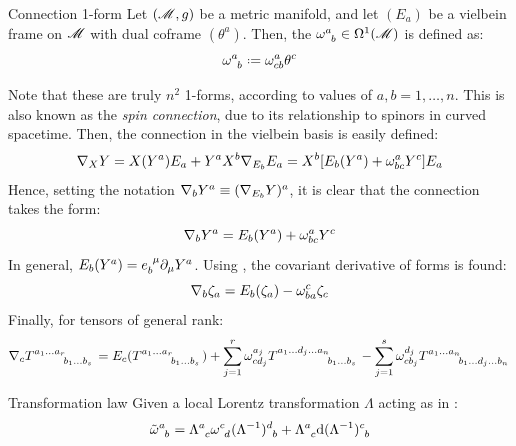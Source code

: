 \begin{definition}{Connection 1-form}{}
  Let $ (\mathscr{M},g) $ be a metric manifold, and let $ (E_a) $ be a vielbein frame on $ \mathscr{M} $ with dual coframe $ (\theta^a) $. Then, the  $ \tensor{\omega}{^a_b} \in \df{1} $ is defined as:
  \begin{equation}
    \tensor{\omega}{^a_b} \defeq \omega^a_{cb} \theta^c
    \label{eq:connection-1-form}
  \end{equation}
\end{definition}

Note that these are truly $ n^2 $ 1-forms, according to values of $ a,b = 1, \dots, n $. This is also known as the \textit{spin connection}, due to its relationship to spinors in curved spacetime.
Then, the connection in the vielbein basis is easily defined:
\begin{equation*}
  \nabla_X Y = X(Y^a) E_a + Y^a X^b \nabla_{E_b} E_a = X^b [E_b(Y^a) + \omega^a_{bc} Y^c] E_a
\end{equation*}
Hence, setting the notation $ \nabla_b Y^a \equiv (\nabla_{E_b} Y)^a $, it is clear that the connection takes the form:
\begin{equation}
  \nabla_b Y^a = E_b(Y^a) + \omega^a_{bc} Y^c
  \label{eq:vielbein-cov-der}
\end{equation}
In general, $ E_b(Y^a) = \tensor{e}{_b^\mu} \pa_\mu Y^a $. Using , the covariant derivative of forms is found:
\begin{equation}
  \nabla_b \zeta_a = E_b(\zeta_a) - \omega^c_{ba} \zeta_c
\end{equation}
Finally, for tensors of general rank:
\begin{equation}
  \na_c \tensor{T}{^{a_1 \dots a_r}_{b_1 \dots b_s}} = E_c(\tensor{T}{^{a_1 \dots a_r}_{b_1 \dots b_s}}) + \sum_{j = 1}^r \omega^{a_j}_{c d_j} \tensor{T}{^{a_1 \dots d_j \dots a_n}_{b_1 \dots b_s}} - \sum_{j = 1}^s \omega^{d_j}_{c b_j} \tensor{T}{^{a_1 \dots a_n}_{b_1 \dots d_j \dots b_n}}
\end{equation}

\begin{lemma}{Transformation law}{}
  Given a local Lorentz transformation $ \Lambda $ acting as in :
  \begin{equation}
    \tensor{\tilde{\omega}}{^a_b} = \tensor{\Lambda}{^a_c} \tensor{\omega}{^c_d} \tensor{(\Lambda^{-1})}{^d_b} + \tensor{\Lambda}{^a_c} \dd \tensor{(\Lambda^{-1})}{^c_b}
    \label{eq:con-1-form-trans}
  \end{equation}
\end{lemma}

